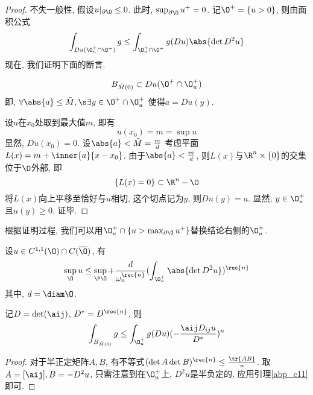 \begin{proof}
    不失一般性, 假设$u|_{\partial \O} \le 0$.  此时, $\sup_{\partial \O}u^+=0$.  记$\O^+=\{u >0\}$, 则由面积公式
    \begin{equation}
        \int_{Du(\O_u^+ \cap \O^+)}g \le \int_{\O_u^+\cap \O^+} g(Du) \abs{\det D^2u}
    \end{equation}
    现在, 我们证明下面的断言.  
    \begin{claim*}
        \begin{equation}
            B_{\tilde{M}(0)} \subset Du(\O^+\cap \O^+_u)
        \end{equation}
        即, $\forall \abs{a} \le \tilde{M}, \s \exists  y \in \O^+ \cap \O^+_u$ 使得$a=Du(y)$.  
    \end{claim*}
    设$u$在$x_0$处取到最大值$m$, 即有
    \begin{equation}
        u(x_0)=m=\sup u 
    \end{equation}
    显然, $Du(x_0)=0$.  设$\abs{a} < \tilde{M} = \frac{m}{d}$ 考虑平面$L(x)=m+\inner{a}{x-x_0}$.  由于$\abs{a} < \frac{m}{d}$, 则$L(x)$与$\R^n \times \{0\}$的交集位于$\O$外部, 即 
    \begin{equation}
        \{L(x)=0\} \subset \R^n -\O
    \end{equation}
    将$L(x)$向上平移至恰好与$u$相切, 这个切点记为$y$, 则$Du(y)=a$.  显然, $y \in \O^+_u$且$u(y) \ge 0$.  证毕.  
\end{proof}
\begin{remark}
    根据证明过程, 我们可以用$\O^+_u \cap \{u > \max_{\partial \O}u^+\}$替换结论右侧的$\O^+_u$.  
\end{remark}
\begin{corollary}
    设$u \in C^{1, 1}(\O) \cap C(\overline{\O})$, 有
    \begin{equation}
        \sup_\O u \le \sup_{\P \O} + \frac{d}{\omega_n^{\rec{n}}}(\int_{\O^+_u}\abs{\det D^2u})^\rec{n}
    \end{equation}
    其中, $d=\diam \O$.  
\end{corollary}
\begin{corollary} \label{abp_cor1}
    记$D=\det(\aij)$, $D^*=D^\rec{n}$, 则
    \begin{equation}
        \int_{B_{\tilde{M}(0)}}g \le \int_{\O^+_u}g(Du)(-\frac{\aij D_{ij}u}{D^*})^n
    \end{equation}
\end{corollary}
\begin{proof}
    对于半正定矩阵$A, B$, 有不等式$(\det A \det B)^\rec{n} \le \frac{\tr{AB}}{n}$.  取$A=[\aij], B=-D^2u$, 只需注意到在$\O^+_u$上, $D^2u$是半负定的, 应用引理\eqref{abp_c11}即可.  
\end{proof}
